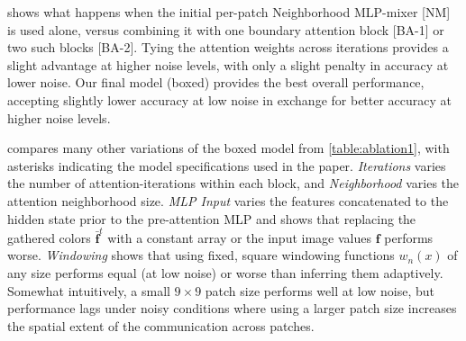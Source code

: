 \documentclass[main.tex]{subfiles}
\begin{document}
 shows what happens when the initial per-patch Neighborhood MLP-mixer [NM] is used alone, versus combining it with one boundary attention block [BA-1] or two such blocks [BA-2]. Tying the attention weights across iterations provides a slight advantage at higher noise levels, with only a slight penalty in accuracy at lower noise. Our final model (boxed) provides the best overall performance, accepting slightly lower accuracy at low noise in exchange for better accuracy at higher noise levels.

 compares many other variations of the boxed model from \cref{table:ablation1}, with asterisks indicating the model specifications used in the paper. \emph{Iterations} varies the number of attention-iterations within each block, and \emph{Neighborhood} varies the attention neighborhood size. \emph{MLP Input} varies the features concatenated to the hidden state prior to the pre-attention MLP and shows that replacing the gathered colors $\bar{\mathbf{f}}^t$ with a constant array or the input image values $\mathbf{f}$ performs worse. \emph{Windowing} shows that using fixed, square windowing functions $w_n(x)$ of any size performs equal (at low noise) or worse than inferring them adaptively. Somewhat intuitively, a small $9\times 9$ patch size performs well at low noise, but performance lags under noisy conditions where using a larger patch size increases the spatial extent of the communication across patches.
\end{document}
